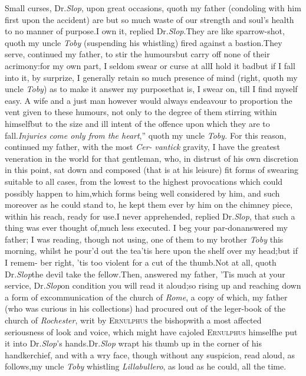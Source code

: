 \documentclass{article}
\begin{document}
Small curses, Dr.\@ \textit{Slop}, upon great occasions, quoth my
father (condoling with him first upon the accident) are but so much
waste of our strength and soul’s health to no manner of
purpose.\tsk I own
it, replied Dr.\@ \textit{Slop}.\tsh They are like\break
sparrow-shot, quoth my uncle \textit{Toby} (suspending
his whistling) fired against a\break
bastion.\tsh They serve,
continued my father, to stir the humours\tsh but carry off
none of their acrimony:\tsk for my own part, I seldom swear or
curse at all\tsh\break I hold it bad\tsh but if I fall into it,
by surprize, I generally retain so much presence of mind (right,
quoth my uncle \textit{Toby}) as to make it answer my
purpose\tsh that is, I swear on, till I find myself easy.\break
A wife and a just man however would always endeavour to
proportion the vent given to these humours, not only to the
degree of them stirring within himself\tsk but to the size and
ill intent of the offence upon which they are to
fall.\tsh\break\lqq\textit{Injuries come only from the
heart},”\tsh\break
quoth my uncle \textit{Toby.} For this
reason, continued my father, with the most
\textit{Cer-} \textit{vantick}
gravity, I have the greatest veneration in the world for that gentleman, who, in
distrust of his own discretion in this point, sat down and composed (that is at his
leisure) fit forms of swearing suitable to all cases, from the lowest to the highest
provocations which could possibly happen to him,\tsk which forms being well considered
by him, and such moreover as he could stand to, he kept them ever by him on the
chimney piece, within his reach, ready for use.\tsk I ne\-ver apprehended, replied
Dr.\@ \textit{Slop}, that such a thing was ever thought of,\tsh\break much less
executed. I beg your par-\break don\tsk answered my father; I was reading, though not using,
one of them to my brother \textit{Toby} this morning, whilst he pour’d out the
tea\tsk ’tis here upon the shelf over my head;\tsk but if I remem-\break
ber right, ’tis too violent for a cut of the
thumb.\tsk Not at all, quoth Dr.\@ \textit{Slop}\tsk the
devil take the fellow.\tsk Then, answered my father, ’Tis much at your service,
Dr.\@ \textit{Slop}\tsh on condition you will read it aloud;\tsh so rising up and
reaching down a form of excommunication of the church of \textit{Rome}, a copy of
which, my\break
father (who was curious in his collections) had procured out of the
leger-book of the church of \textit{Rochester}, writ by \textsc{Ernulphus} the
bishop\tsh with a most affected seriousness of look and voice, which might have
cajoled \textsc{Ernulphus}\break
himself\tsk he put it into Dr.\@ \textit{Slop}’s hands.\break\tsh Dr.\@ \textit{Slop} wrapt his thumb up in the corner of his handkerchief,
and with a wry face, though without any suspicion, read aloud, as follows,\tsk my
uncle \textit{Toby} whistling \textit{Lillabullero}, as loud as he could, all the
time.
\end{document}
